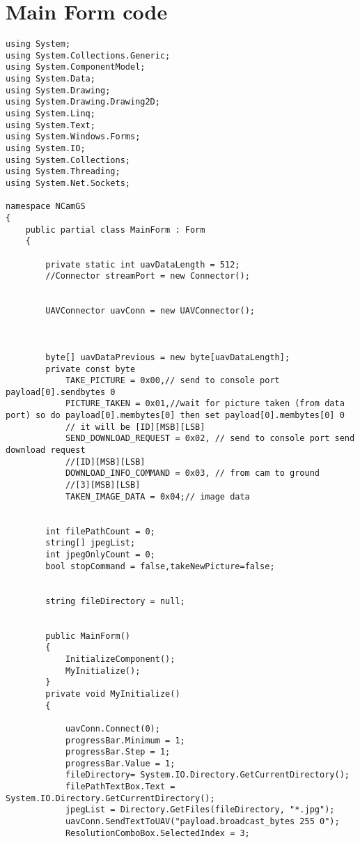 \lstset{numbers=left,
numberstyle=\footnotesize, 
stepnumber=2,numbersep=5pt}
\section{Main Form code}
\begin{lstlisting}[caption=Main Form of GUI, label=appen:main_form]
using System;
using System.Collections.Generic;
using System.ComponentModel;
using System.Data;
using System.Drawing;
using System.Drawing.Drawing2D;
using System.Linq;
using System.Text;
using System.Windows.Forms;
using System.IO;
using System.Collections;
using System.Threading;
using System.Net.Sockets;

namespace NCamGS
{
    public partial class MainForm : Form
    {
        
        private static int uavDataLength = 512;
        //Connector streamPort = new Connector();


        UAVConnector uavConn = new UAVConnector();

       

        byte[] uavDataPrevious = new byte[uavDataLength];
        private const byte
            TAKE_PICTURE = 0x00,// send to console port payload[0].sendbytes 0
            PICTURE_TAKEN = 0x01,//wait for picture taken (from data port) so do payload[0].membytes[0] then set payload[0].membytes[0] 0
            // it will be [ID][MSB][LSB]
            SEND_DOWNLOAD_REQUEST = 0x02, // send to console port send download request
            //[ID][MSB][LSB]
            DOWNLOAD_INFO_COMMAND = 0x03, // from cam to ground
            //[3][MSB][LSB]
            TAKEN_IMAGE_DATA = 0x04;// image data
        

        int filePathCount = 0;
        string[] jpegList;
        int jpegOnlyCount = 0;
        bool stopCommand = false,takeNewPicture=false;


        string fileDirectory = null;


        public MainForm()
        {
            InitializeComponent();
            MyInitialize();
        }
        private void MyInitialize()
        {

            uavConn.Connect(0);
            progressBar.Minimum = 1;
            progressBar.Step = 1;
            progressBar.Value = 1;
            fileDirectory= System.IO.Directory.GetCurrentDirectory();
            filePathTextBox.Text = System.IO.Directory.GetCurrentDirectory();
            jpegList = Directory.GetFiles(fileDirectory, "*.jpg");
            uavConn.SendTextToUAV("payload.broadcast_bytes 255 0");
            ResolutionComboBox.SelectedIndex = 3;


\end{lstlisting}
